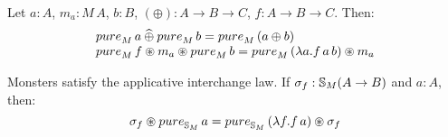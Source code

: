 \begin{lemma}\label{lemma:pure_lift}
Let $a:A$, $m_a : M\, A$, $b:B$, $(\oplus) : A \rightarrow B \rightarrow C$, $f : A \rightarrow B \rightarrow C$. Then:
$$
\begin{array}{l}
\apure_M\, a \alift{\oplus} \apure_M\, b = \apure_M\, (a \oplus b)\\
\apure_M\, f \appl m_a \appl \apure_M\, b = \apure_M\, (\lambda a . f\, a\, b) \appl m_a
\end{array}
$$
\end{lemma}

\begin{lemma}
Monsters satisfy the applicative interchange law.
 If $\sigma_f: \mathbb{S}_{M}(A\rightarrow B)$ and $a:A$, then:
$$
\sigma_f \appl \apure_{\stream{M}}\,a = \apure_{\stream{M}}\,(\lambda f. f\,a) \appl \sigma_f
$$
\end{lemma}
